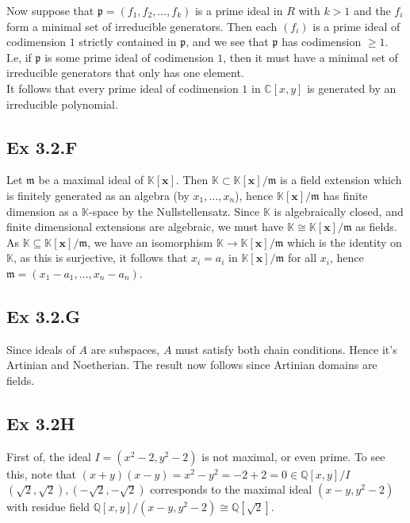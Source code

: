 \documentclass{article}
\theoremstyle{definition}
\newcommand{\Q}{\mathbb{Q}}
\newcommand{\C}{\mathbb{C}}
\newcommand{\K}{\mathbb{K}}
\newcommand{\Kx}{\K[\bm{x}]}
\begin{document}
Now suppose that $\mathfrak{p} = (f_1, f_2, \ldots, f_k)$ is a prime ideal in
$R$ with $k > 1$ and the $f_i$ form a minimal set of irreducible generators.
Then each $(f_i)$ is a prime ideal of codimension $1$ strictly contained in
$\mathfrak{p}$, and we see that $\mathfrak{p}$ has codimension $\geq 1$. \\

I.e, if $\mathfrak{p}$ is some prime ideal of codimension $1$, then it must
have a minimal set of irreducible generators that only has one element. \\

It follows that every prime ideal of codimension $1$ in $\C[x, y]$ is generated
by an irreducible polynomial.

\subsection*{Ex 3.2.F}

Let $\mathfrak{m}$ be a maximal ideal of $\Kx$. Then $\K \subset
\Kx/\mathfrak{m}$ is a field extension which is finitely generated as an
algebra (by $x_1, \ldots, x_n$), hence $\Kx/\mathfrak{m}$ has finite dimension
as a $\K$-space by the Nullstellensatz. Since $\K$ is algebraically closed, and
finite dimensional extensions are algebraic, we must have $\K \cong
\Kx/\mathfrak{m}$ as fields. As $\K \subseteq \Kx/\mathfrak{m}$, we have an
isomorphism $\K \to \Kx/\mathfrak{m}$ which is the identity on $\K$, as this is
surjective, it follows that $x_i = a_i$ in $\Kx/\mathfrak{m}$ for all $x_i$,
hence $\mathfrak{m} = (x_1 - a_1, \ldots, x_n - a_n)$.

\subsection*{Ex 3.2.G}

Since ideals of $A$ are subspaces, $A$ must satisfy both chain conditions.
Hence it's Artinian and Noetherian. The result now follows since Artinian
domains are fields.

\subsection*{Ex 3.2H}

First of, the ideal $I = (x^2 - 2, y^2 - 2)$ is not maximal, or even prime. To
see this, note that $(x + y)(x - y) = x^2 - y^2 = -2 + 2 = 0 \in \Q[x, y] / I$
\\

$(\sqrt{2}, \sqrt{2}), (-\sqrt{2}, -\sqrt{2})$ corresponds to the maximal ideal
$(x - y, y^2 - 2)$ with residue field $\Q[x, y]/(x - y, y^2 - 2) \cong
\Q[\sqrt{2}]$. \\
\end{document}
